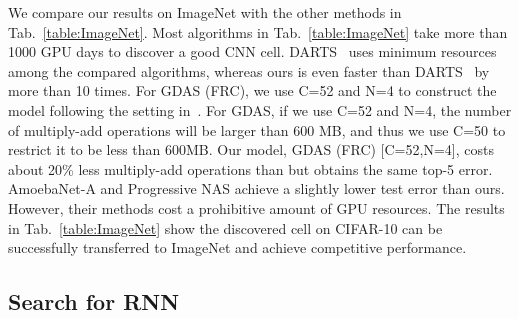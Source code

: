 \documentclass[10pt,twocolumn,letterpaper]{article}
\def\Tabref#1{Tab.~\ref{#1}}
\begin{document}
We compare our results on ImageNet with the other methods in \Tabref{table:ImageNet}.
Most algorithms in \Tabref{table:ImageNet} take more than 1000 GPU days to discover a good CNN cell.
DARTS~\cite{liu2019darts} uses minimum resources among the compared algorithms, whereas ours is even faster than DARTS~\cite{liu2019darts} by more than 10 times.
For GDAS (FRC), we use C=52 and N=4 to construct the model following the setting in~\cite{liu2019darts}.
For GDAS, if we use C=52 and N=4, the number of multiply-add operations will be larger than 600 MB, and thus we use C=50 to restrict it to be less than 600MB.
Our model, GDAS (FRC) [C=52,N=4], costs about 20\% less multiply-add operations than \cite{liu2019darts} but obtains the same top-5 error.
AmoebaNet-A and Progressive NAS achieve a slightly lower test error than ours.
However, their methods cost a prohibitive amount of GPU resources.
The results in \Tabref{table:ImageNet} show the discovered cell on CIFAR-10 can be successfully transferred to ImageNet and achieve competitive performance.







\subsection{Search for RNN}\label{sec:exp-rnn}
\end{document}
